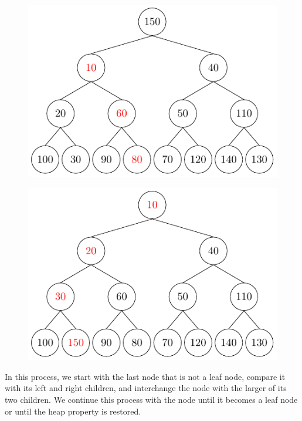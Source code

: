 \begin{center}
\begin{minipage}{0.24\textwidth}
\begin{figure}[H]
  \includegraphics[width=\textwidth]{Figure/Percolate7.pdf}
\end{figure}
\end{minipage}
\begin{minipage}{0.24\textwidth}
\begin{figure}[H]
  \centering
  \includegraphics[width=\textwidth]{Figure/Percolate8.pdf}
\end{figure}
\end{minipage}
\end{center}

In this process, we start with the last node that is not a leaf node, compare it with its left and right children, and interchange the node with the larger of its two children. We continue this process with the node until it becomes a leaf node or until the heap property is restored.

